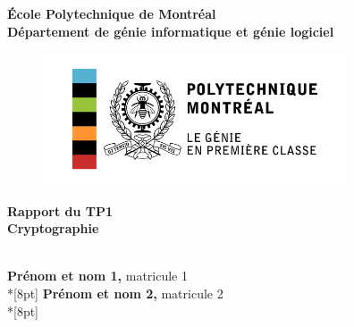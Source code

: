 \documentclass[a4paper, 12pt, french]{article}
\begin{document}
\begin{titlepage}
\begin{center}
\textbf{\LARGE \'Ecole Polytechnique de Montr\'eal}\\[0.5cm] 
\textbf{\large D\'epartement de g\'enie informatique et g\'enie logiciel}\\[0.2cm]
\vspace{20pt}
\begin{figure}
 	\begin{center}	\includegraphics[width=90mm,scale=1.0]{images/poly.png}
	\end{center}
\end{figure}

\par
\vspace{20pt}
\vspace{15pt}
\myrule[1pt][7pt]
\textbf{\LARGE  Rapport du TP1}\\
\vspace{7pt}
\textbf{Cryptographie}\\
\vspace{6pt}
\textbf{\large }\\
\myrule[1pt][7pt]

\vspace{25pt}

{\bfseries Prénom et nom 1,} matricule 1\\*[8pt]
{\bfseries Prénom et nom 2,} matricule 2\\*[8pt]


\vspace{45pt}

\end{center}

\par
\vfill

\end{titlepage}





\tableofcontents
\newpage
\end{document}
